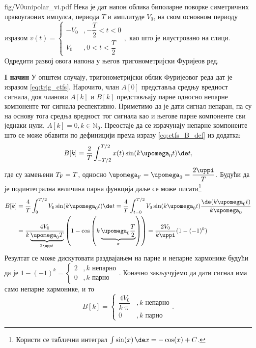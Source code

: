 \noindent\begin{slikaDesno}{fig/V0unipolar_vi.pdf}
\PID \label{z:pravougani_po_def}  Нека је дат напон облика биполарне поворке симетричних правоугаоних импулса, периода $T$ и амплитуде $V_0$, 
на свом основном периоду изразом
$
v(t) = 
\begin{cases}
    -V_0 &, -\dfrac{T}{2} < t < 0 \\[2mm]
    V_0  &, 0 < t < \dfrac{T}{2}
\end{cases},
$ као што је илустровано на слици. Одредити развој овога напона у његов тригонометријски Фуријеов ред.
\end{slikaDesno}
%
\RESENJE
\textbf{I начин}
У општем случају, тригонометријски облик Фуријеовог реда дат је изразом \eqref{eq:trig_ctfs}. Нарочито, члан 
$A[0]$ представља средњу вредност сигнала, док чланови $A[k]$ и $B[k]$ представљају парне односно непарне 
компоненте тог сигнала респективно. Приметимо да је дати сигнал непаран, па су на основу тога средња вредност 
тог сигнала као и његове парне компоненте сви једнаки нули, $A[k] = 0, k \in \mathbb N_0$. Преостаје да се 
израчунају непарне компоненте што се може обавити по дефиницији према изразу \eqref{eq:ctfs_B_def} из додатка: 
\begin{eqnarray}
    B[k] = \dfrac{2}{T}\int_{-T/2}^{T/2} x(t) \sin(k\upomega_0 t) \de t, 
\end{eqnarray}
где су замењени $T_{\rm F} = T$, односно $\upomega_{\rm F} = \upomega_0 = \dfrac{2\uppi}{T}$. Будући да је 
подинтегрална величина парна функција даље се  може писати\footnote{Користи се таблични 
интеграл $\int \sin(x)\,\de x = -\cos(x) + C$.}
\begin{align}
    B[k] &= \dfrac{4}{T} \int_0^{T/2} V_0 \sin(k\upomega_0 t) \de t 
         = \dfrac{4}{T} \int_{t = 0}^{T/2} V_0 \sin(k\upomega_0 t) \dfrac{ \de(k \upomega_0 t) }{k \upomega_0} 
         \\
         &= \dfrac{4V_0}{k \underbrace{\upomega_0 T}_{2\uppi}} \left( 1 - \cos\left( k \underbrace{\upomega_0 \dfrac{T}{2}}_{\pi} \right) \right)
         = \dfrac{2V_0}{k\uppi} ( 1 - (-1)^k )
\end{align}
Резултат се може дискутовати раздвајањем на парне и непарне хармонике будући да је 
$1 - (-1)^k = 
\begin{cases}
    2 &, k \text{ непарно} \\
    0 &, k \text{ парно}
\end{cases}$. \vspace*{1mm}
Коначно закључујемо да дати сигнал има само непарне хармонике, и то 
\begin{equation}
B[k] = 
\begin{cases}
    \dfrac{4V_0}{k\uppi} &, k \text{ непарно} \\[2mm]
    0 &, k \text{ парно} 
\end{cases}.\label{eq:\ID.resenje1}
\end{equation}

